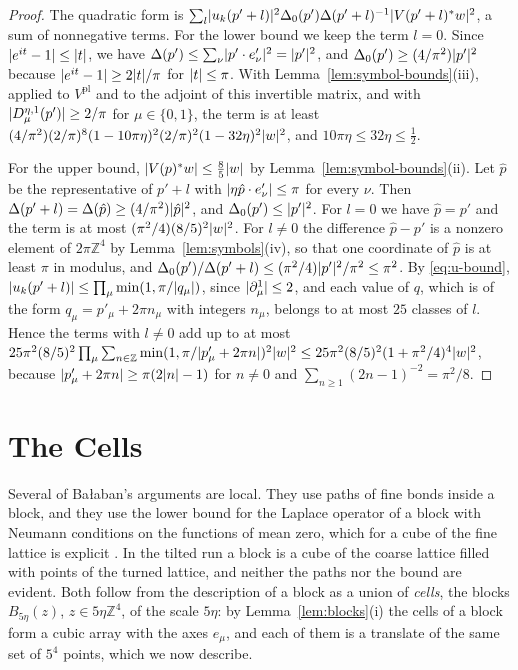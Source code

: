 \documentclass[11pt]{preprint}
\DeclarePairedDelimiter{\abs}{\lvert}{\rvert}
\numberwithin{equation}{section}
\theoremstyle{definition}
\theoremstyle{remark}
\theoremstyle{plain}
\begin{document}
\begin{proof}
The quadratic form is $\sum_l\abs{u_k(p' + l)}^2\Delta_0(p')\Delta(p' + l)^{-1}\abs{V(p' + l)^*w}^2$, a sum of nonnegative terms. For the lower bound we keep the term $l = 0$. Since $\abs{e^{it} - 1} \leq \abs{t}$, we have $\Delta(p') \leq \sum_\nu\abs{p' \cdot e'_\nu}^2 = \abs{p'}^2$, and $\Delta_0(p') \geq (4/\pi^2)\abs{p'}^2$ because $\abs{e^{it} - 1} \geq 2\abs{t}/\pi$ for $\abs{t} \leq \pi$. With Lemma~\ref{lem:symbol-bounds}(iii), applied to $V^{\mathrm{pl}}$ and to the adjoint of this invertible matrix, and with $\abs{D^{\eta,1}_\mu(p')} \geq 2/\pi$ for $\mu \in \{ 0, 1 \}$, the term is at least $(4/\pi^2)(2/\pi)^8(1 - 10\pi\eta)^2(2/\pi)^2(1 - 32\eta)^2\abs{w}^2$, and $10\pi\eta \leq 32\eta \leq \frac12$.

For the upper bound, $\abs{V(p)^*w} \leq \frac85\abs{w}$ by Lemma~\ref{lem:symbol-bounds}(ii). Let $\hat p$ be the representative of $p' + l$ with $\abs{\eta\hat p \cdot e'_\nu} \leq \pi$ for every $\nu$. Then $\Delta(p' + l) = \Delta(\hat p) \geq (4/\pi^2)\abs{\hat p}^2$, and $\Delta_0(p') \leq \abs{p'}^2$. For $l = 0$ we have $\hat p = p'$ and the term is at most $(\pi^2/4)(8/5)^2\abs{w}^2$. For $l \neq 0$ the difference $\hat p - p'$ is a nonzero element of $2\pi\mathbb Z^4$ by Lemma~\ref{lem:symbols}(iv), so that one coordinate of $\hat p$ is at least $\pi$ in modulus, and $\Delta_0(p')/\Delta(p' + l) \leq (\pi^2/4)\abs{p'}^2/\pi^2 \leq \pi^2$. By \eqref{eq:u-bound}, $\abs{u_k(p' + l)} \leq \prod_\mu\min(1, \pi/\abs{q_\mu})$, since $\abs{\partial^1_\mu} \leq 2$, and each value of $q$, which is of the form $q_\mu = p'_\mu + 2\pi n_\mu$ with integers $n_\mu$, belongs to at most $25$ classes of $l$. Hence the terms with $l \neq 0$ add up to at most $25\pi^2(8/5)^2\prod_\mu\sum_{n \in \mathbb Z}\min(1, \pi/\abs{p'_\mu + 2\pi n})^2\abs{w}^2 \leq 25\pi^2(8/5)^2(1 + \pi^2/4)^4\abs{w}^2$, because $\abs{p'_\mu + 2\pi n} \geq \pi(2\abs{n} - 1)$ for $n \neq 0$ and $\sum_{n \geq 1}(2n - 1)^{-2} = \pi^2/8$.
\end{proof}

\section{The Cells}\label{sec:cells}

Several of Ba{\l}aban's arguments are local. They use paths of fine bonds inside a block, and they use the lower bound for the Laplace operator of a block with Neumann conditions on the functions of mean zero, which for a cube of the fine lattice is explicit \cite[(2.27), p.~580]{BalabanRDG}. In the tilted run a block is a cube of the coarse lattice filled with points of the turned lattice, and neither the paths nor the bound are evident. Both follow from the description of a block as a union of \emph{cells}, the blocks $B_{5\eta}(z)$, $z \in 5\eta\mathbb Z^4$, of the scale $5\eta$: by Lemma~\ref{lem:blocks}(i) the cells of a block form a cubic array with the axes $e_\mu$, and each of them is a translate of the same set of $5^4$ points, which we now describe.
\end{document}
